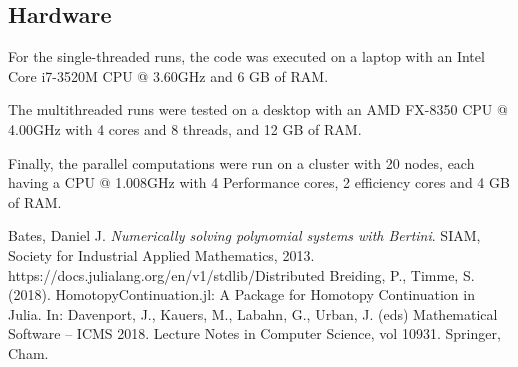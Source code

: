 \documentclass[a4paper]{article}
\theoremstyle{definition}
\theoremstyle{definition}
\theoremstyle{remark}
\theoremstyle{definition}
\begin{document}
\subsection{Hardware}\label{sec:hw}
For the single-threaded runs, the code was executed on a laptop with an Intel Core i7-3520M CPU @ 3.60GHz and 6 GB of RAM.

The multithreaded runs were tested on a desktop with an AMD FX-8350 CPU @ 4.00GHz with 4 cores and 8 threads, and 12 GB of RAM.

Finally, the parallel computations were run on a cluster with 20 nodes, each having a CPU @ 1.008GHz with 4 Performance cores, 2 efficiency cores and 4 GB of RAM.

 Bates, Daniel J. \textit{Numerically solving polynomial systems with Bertini}. SIAM, Society for Industrial Applied Mathematics, 2013.
 https://docs.julialang.org/en/v1/stdlib/Distributed
 Breiding, P., Timme, S. (2018). HomotopyContinuation.jl: A Package for Homotopy Continuation in Julia. In: Davenport, J., Kauers, M., Labahn, G., Urban, J. (eds) Mathematical Software – ICMS 2018. Lecture Notes in Computer Science, vol 10931. Springer, Cham.
\end{document}
